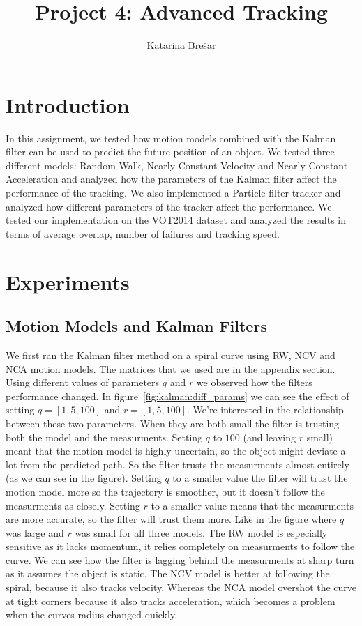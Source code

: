 \documentclass[9pt]{IEEEtran}
\title{\vspace{0ex}
Project 4: Advanced Tracking}
\author{Katarina Brešar\vspace{-4.0ex}}
\begin{document}
\maketitle

\section{Introduction}

In this assignment, we tested how motion models combined with the Kalman filter can be used to predict the future position of an object.
We tested three different models: Random Walk, Nearly Constant Velocity and Nearly Constant Acceleration and
analyzed how the parameters of the Kalman filter affect the performance of the tracking. We also
implemented a Particle filter tracker and analyzed how different parameters of the tracker affect the performance. 
We tested our implementation on the VOT2014 dataset and analyzed the results in terms of average overlap,
number of failures and tracking speed. 

\section{Experiments}

\subsection{Motion Models and Kalman Filters}

We first ran the Kalman filter method on a spiral curve using RW, NCV and NCA motion models. The matrices that we used
are in the appendix section.
Using different values of parameters $q$ and $r$ we observed how the filters performance changed. In figure~\ref{fig:kalman:diff_params} we
can see the effect of setting $q = [1,5,100]$ and $r = [1,5,100]$. We're interested in the relationship between these two parameters.
When they are both small the filter is trusting both the model and the measurments.
Setting $q$ to $100$  (and leaving $r$ small) meant that the motion model is highly uncertain, so the object 
might deviate a lot from the predicted path. 
So the filter trusts the measurments almost entirely (as we can see in the figure). Setting $q$ to a 
smaller value the filter will trust the motion model more so the trajectory is smoother,
but it doesn't follow the measurments as closely. Setting $r$ to a smaller value means
that the measurments are more accurate, so the filter will trust them more. Like in the figure where $q$ was large
and $r$ was small for all three models.
The RW model is especially sensitive as it lacks momentum, it relies completely on measurments to follow the curve. We can see how the filter
is lagging behind the measurments at sharp turn as it assumes the object is static. The NCV model is better at following the spiral, because
it also tracks velocity. Whereas the NCA model overshot the curve at tight corners because it also tracks acceleration, which becomes
a problem when the curves radius changed quickly.
\end{document}
